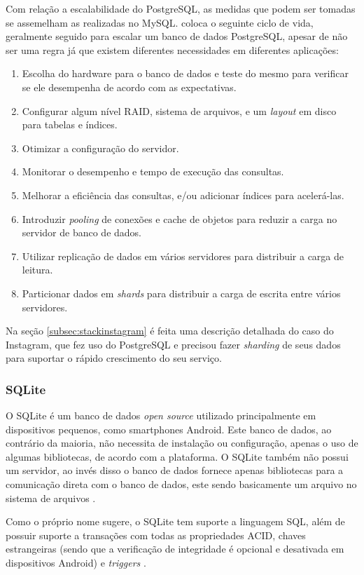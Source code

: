 \documentclass[diss]{template/setrem}
\begin{document}
Com relação a escalabilidade do PostgreSQL, as medidas que podem ser tomadas se assemelham as realizadas no MySQL. \citet[p. 16]{Smith2010} coloca o seguinte ciclo de vida, geralmente seguido para escalar um banco de dados PostgreSQL, apesar de não ser uma regra já que existem diferentes necessidades em diferentes aplicações:
\begin{enumerate}
	\item Escolha do hardware para o banco de dados e teste do mesmo para verificar se ele desempenha de acordo com as expectativas.
	\item Configurar algum nível RAID, sistema de arquivos, e um \emph{layout} em disco para tabelas e índices.
	\item Otimizar a configuração do servidor.
	\item Monitorar o desempenho e tempo de execução das consultas.
	\item Melhorar a eficiência das consultas, e/ou adicionar índices para acelerá-las.
	\item Introduzir \emph{pooling} de conexões e cache de objetos para reduzir a carga no servidor de banco de dados.
	\item Utilizar replicação de dados em vários servidores para distribuir a carga de leitura.
	\item Particionar dados em \emph{shards} para distribuir a carga de escrita entre vários servidores.
\end{enumerate}

Na seção \ref{subsec:stackinstagram} é feita uma descrição detalhada do caso do Instagram, que fez uso do PostgreSQL e precisou fazer \emph{sharding} de seus dados para suportar o rápido crescimento do seu serviço.

\subsubsection{SQLite}
O SQLite é um banco de dados \emph{open source} utilizado principalmente em dispositivos pequenos, como smartphones Android. Este banco de dados, ao contrário da maioria, não necessita de instalação ou configuração, apenas o uso de algumas bibliotecas, de acordo com a plataforma. O SQLite também não possui um servidor, ao invés disso o banco de dados fornece apenas bibliotecas para a comunicação direta com o banco de dados, este sendo basicamente um arquivo no sistema de arquivos \citep{Gargenta2010}.

Como o próprio nome sugere, o SQLite tem suporte a linguagem SQL, além de possuir suporte a transações com todas as propriedades ACID, chaves estrangeiras (sendo que a verificação de integridade é opcional e desativada em dispositivos Android) e \emph{triggers} \citep{Mednieks2010}.
\end{document}
